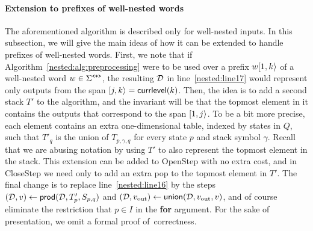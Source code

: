 \paragraph{Extension to prefixes of well-nested words}
The aforementioned algorithm is described only for well-nested inputs. In this subsection, we will give the main ideas of how it can be extended to handle prefixes of well-nested words. First, we note that if Algorithm~\ref{nested:alg:preprocessing} were to be used over a prefix $w[1,k\rangle$ of a well-nested word $w\in\Sigma^{\texttt{<*>}}$, the resulting $\mathcal{D}$ in line~\ref{nested:line17} would represent only outputs from the span $[j,k\rangle = {\sf currlevel}(k)$. Then, the idea is to add a second stack $T'$ to the algorithm, and the invariant will be that the topmost element in it contains the outputs that correspond to the span $[1,j\rangle$. To be a bit more precise, each element contains an extra one-dimensional table, indexed by states in $Q$, such that $T'_q$ is the union of $T_{p,\gamma,q}$ for every state $p$ and stack symbol $\gamma$. Recall that we are abusing notation by using $T'$ to also represent the topmost element in the stack. This extension can be added to {\sc OpenStep} with no extra cost, and in {\sc CloseStep} we need only to add an extra pop to the topmost element in $T'$. The final change is to replace line~\ref{nested:line16} by the steps $(\mathcal{D}, v)\gets \mathsf{prod}(\mathcal{D}, T'_p, S_{p,q})$ and $(\mathcal{D},v_{\text{out}}) \gets \mathsf{union}(\mathcal{D},v_{\text{out}},v)$, and of course eliminate the restriction that $p\in I$ in the {\bf for} argument. For the sake of presentation, we omit a formal proof of~correctness.







